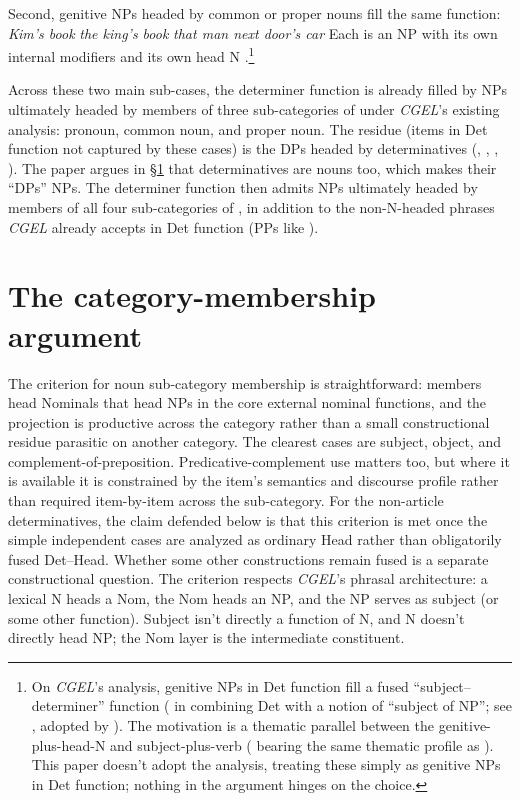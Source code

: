\documentclass[12pt]{article}
\begin{document}
Second, genitive NPs headed by common or proper nouns fill the same function:
\ea\label{ex:gen-NPs}
\ea \textit{Kim's book}
\ex \textit{the king's book}
\ex \textit{that man next door's car}
\z
\z
Each is an NP with its own internal modifiers and its own head N \citep[2]{pullummiller2022nps}.\footnote{On \textit{CGEL}'s analysis, genitive NPs in Det function fill a fused \enquote{subject--determiner} function ( in  combining Det with a notion of \enquote{subject of NP}; see \textcite[Ch.~16 §5]{huddleston2002}, adopted by \textcite{Payne2007}). The motivation is a thematic parallel between the genitive-plus-head-N and subject-plus-verb ( bearing the same thematic profile as ). This paper doesn't adopt the analysis, treating these simply as genitive NPs in Det function; nothing in the argument hinges on the choice.}

Across these two main sub-cases, the determiner function is already filled by NPs ultimately headed by members of three sub-categories of  under \textit{CGEL}'s existing analysis: pronoun, common noun, and proper noun. The residue (items in Det function not captured by these cases) is the DPs headed by determinatives (, , , ). The paper argues in §\ref{sec:argument} that determinatives are nouns too, which makes their \enquote{DPs} NPs. The determiner function then admits NPs ultimately headed by members of all four sub-categories of , in addition to the non-N-headed phrases \textit{CGEL} already accepts in Det function (PPs like ).

\section{The category-membership argument}\label{sec:argument}

The criterion for noun sub-category membership is straightforward: members head Nominals that head NPs in the core external nominal functions, and the projection is productive across the category rather than a small constructional residue parasitic on another category. The clearest cases are subject, object, and complement-of-preposition. Predicative-complement use matters too, but where it is available it is constrained by the item's semantics and discourse profile rather than required item-by-item across the sub-category. For the non-article determinatives, the claim defended below is that this criterion is met once the simple independent cases are analyzed as ordinary Head rather than obligatorily fused Det--Head. Whether some other constructions remain fused is a separate constructional question. The criterion respects \textit{CGEL}'s phrasal architecture: a lexical N heads a Nom, the Nom heads an NP, and the NP serves as subject (or some other function). Subject isn't directly a function of N, and N doesn't directly head NP; the Nom layer is the intermediate constituent.
\end{document}
